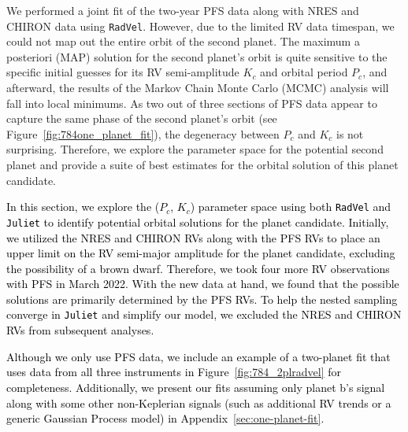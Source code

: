 \documentclass[twocolumn]{aastex631}
\newcommand{\rev}[1]{\textcolor{black}{#1}}
\newcommand{\blv}[1]{\textcolor{blue}{#1}}
\newcommand{\code}[1]{{\texttt{#1}}}
\begin{document}
We performed a joint fit of the two-year PFS data along with NRES and CHIRON data using \code{RadVel}. However, due to the limited RV data timespan, we could not map out the entire orbit of the second planet. The maximum a posteriori (MAP) solution for the second planet's orbit is quite sensitive to the specific initial guesses for its RV semi-amplitude $K_c$ and orbital period $P_c$, and afterward, the results of the Markov Chain Monte Carlo (MCMC) analysis will fall into local minimums. As two out of three sections of PFS data appear to capture the same phase of the second planet's orbit (see Figure~\ref{fig:784one_planet_fit}), the degeneracy between $P_c$ and $K_c$ is not surprising. Therefore, we explore the parameter space for the potential second planet and provide a suite of best estimates for the orbital solution of this planet candidate. 


\rev{In this section, we explore the ($P_c$, $K_c$) parameter space using both \code{RadVel} and \code{Juliet} to identify potential orbital solutions for the planet candidate. Initially, we utilized the NRES and CHIRON RVs along with the PFS RVs to place an upper limit on the RV semi-major amplitude for the planet candidate, excluding the possibility of a brown dwarf. Therefore, we took four more RV observations with PFS in March 2022. With the new data at hand, we found that the possible solutions are primarily determined by the PFS RVs. To help the nested sampling converge in \code{Juliet} and simplify our model, we excluded the NRES and CHIRON RVs from subsequent analyses.} 

\rev{Although we only use PFS data, we include an example of a two-planet fit that uses data from all three instruments in Figure~\ref{fig:784_2plradvel} for completeness. Additionally, we present our fits assuming only planet b's signal along with some other non-Keplerian signals (such as additional RV trends or a generic Gaussian Process model) in Appendix~\ref{sec:one-planet-fit}.}
\end{document}
